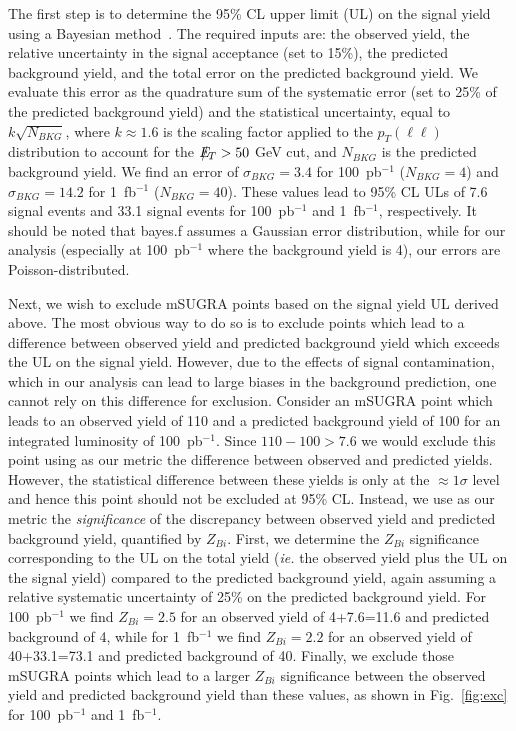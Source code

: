 The first  step is to  determine the 95\%  CL upper limit (UL)  on the
signal yield using a Bayesian method~\cite{bayes}. The required  inputs 
are: the observed yield, the
relative  uncertainty in  the  signal acceptance  (set  to 15\%),  the
predicted  background yield,  and  the total  error  on the  predicted
background yield. We evaluate this  error as the quadrature sum of the
systematic error (set  to 25\% of the predicted  background yield) and
the  statistical   uncertainty,  equal  to   $k\sqrt{N_{BKG}}$,  where
$k\approx1.6$ is  the scaling factor applied  to the $p_{T}(\ell\ell)$
distribution to  account for the  $E\!\!\!\!/_T>50~$GeV cut, and  $N_{BKG}$ is
the   predicted    background   yield.    We   find    an   error   of
$\sigma_{BKG}=3.4$     for     100~pb$^{-1}$     ($N_{BKG}=4$)     and
$\sigma_{BKG}=14.2$ for 1~fb$^{-1}$  ($N_{BKG}=40$). These values lead
to  95\% CL  ULs  of 7.6  signal  events and  33.1  signal events  for
100~pb$^{-1}$ and  1~fb$^{-1}$, respectively. It should  be noted that
bayes.f assumes a Gaussian  error distribution, while for our analysis
(especially  at 100~pb$^{-1}$ where  the background  yield is  4), our
errors are Poisson-distributed.

Next, we  wish to exclude mSUGRA  points based on the  signal yield UL
derived above.   The most obvious  way to do  so is to  exclude points
which  lead  to a  difference  between  observed  yield and  predicted
background yield  which exceeds the  UL on the signal  yield. However,
due to the effects of  signal contamination, which in our analysis can
lead to large biases in  the background prediction, one cannot rely on
this difference for exclusion. Consider an mSUGRA point which leads to
an observed yield  of 110 and a predicted background  yield of 100 for
an  integrated luminosity  of 100~pb$^{-1}$.   Since  $110-100>7.6$ we
would exclude  this point using  as our metric the  difference between
observed  and predicted  yields. However,  the  statistical difference
between these yields  is only at the $\approx1\sigma$  level and hence
this point should  not be excluded at 95\% CL. Instead,  we use as our
metric  the {\em  significance}  of the  discrepancy between  observed
yield and predicted background  yield, quantified by $Z_{Bi}$.  First,
we determine the $Z_{Bi}$ significance  corresponding to the UL on the
total yield ({\em  ie.}  the observed yield plus the  UL on the signal
yield) compared  to the predicted  background yield, again  assuming a
relative systematic  uncertainty of  25\% on the  predicted background
yield.  For  100~pb$^{-1}$ we find $Z_{Bi}=2.5$ for  an observed yield
of 4+7.6=11.6 and predicted background  of 4, while for 1~fb$^{-1}$ we
find $Z_{Bi}=2.2$ for an  observed yield of 40+33.1=73.1 and predicted
background of 40.  Finally, we  exclude those mSUGRA points which lead
to  a larger  $Z_{Bi}$  significance between  the  observed yield  and
predicted   background  yield   than   these  values,   as  shown   in
Fig.~\ref{fig:exc}   for 100~pb$^{-1}$  and
1~fb$^{-1}$.


